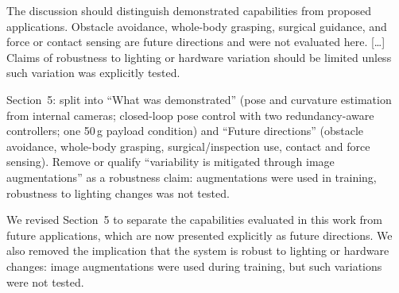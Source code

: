 \documentclass[10pt,a4paper]{article}
\begin{document}
\begin{rev}
The discussion should distinguish demonstrated capabilities from proposed applications. Obstacle avoidance, whole-body grasping, surgical guidance, and force or contact sensing are future directions and were not evaluated here. [\dots] Claims of robustness to lighting or hardware variation should be limited unless such variation was explicitly tested.
\end{rev}
\begin{todo}
Section~5: split into ``What was demonstrated'' (pose and curvature estimation from internal cameras; closed-loop pose control with two redundancy-aware controllers; one 50\,g payload condition) and ``Future directions'' (obstacle avoidance, whole-body grasping, surgical/inspection use, contact and force sensing). Remove or qualify ``variability is mitigated through image augmentations'' as a robustness claim: augmentations were used in training, robustness to lighting changes was not tested.
\end{todo}
\begin{resp}
We revised Section~5 to separate the capabilities evaluated in this work from future applications, which are now presented explicitly as future directions. We also removed the implication that the system is robust to lighting or hardware changes: image augmentations were used during training, but such variations were not tested.
\end{resp}
\end{document}
